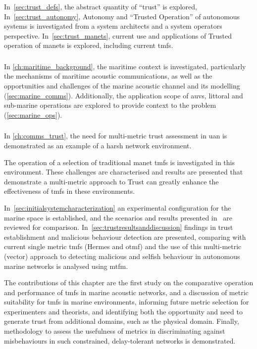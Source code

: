 In~\autoref{sec:trust_defs}, the abstract quantity of ``trust'' is explored,
In~\autoref{sec:trust_autonomy}, Autonomy and ``Trusted Operation'' of autonomous systems is investigated from a system architects and a system operators perspective.
In~\autoref{sec:trust_manets}, current use and applications of Trusted operation of \glspl{manet} is explored, including current \glspl{tmf}.

\subsubsection{}
In \autoref{ch:maritime_background}, the maritime context is investigated, particularly the mechanisms of maritime acoustic communications, as well as the opportunities and challenges of the marine acoustic channel and its modelling (\autoref{sec:marine_comms}).
Additionally, the application scope of \glspl{auv}, littoral and sub-marine operations are explored to provide context to the problem (\autoref{sec:marine_ops}).

\subsubsection{}
In \autoref{ch:comms_trust}, the need for multi-metric trust assessment in \gls{uan} is demonstrated as an example of a harsh network environment.

The operation of a selection of traditional \gls{manet} \glspl{tmf} is investigated in this environment.
These challenges are characterised and results are presented that demonstrate a multi-metric approach to Trust can greatly enhance the effectiveness of \glspl{tmf} in these environments.

In~\autoref{sec:initialsystemcharacterization} an experimental configuration for the marine space is established, and the scenarios and results presented in~\citet{Guo11} are reviewed for comparison.
In~\autoref{sec:trustresultsanddiscussion} findings in trust establishment and malicious behaviour detection are presented, comparing with current single metric \glspl{tmf} (Hermes and \gls{otmf}) and the use of this multi-metric (vector) approach to detecting malicious and selfish behaviour in autonomous marine networks is analysed using \gls{mtfm}.

The contributions of this chapter are the first study on the comparative operation and performance of \glspl{tmf} in marine acoustic networks, and a discussion of metric suitability for \glspl{tmf} in marine environments, informing future metric selection for experimenters and theorists, and identifying both the opportunity and need to generate trust from additional domains, such as the physical domain.
Finally, methodology to assess the usefulness of metrics in discriminating against misbehaviours in such constrained, delay-tolerant networks is demonstrated.

